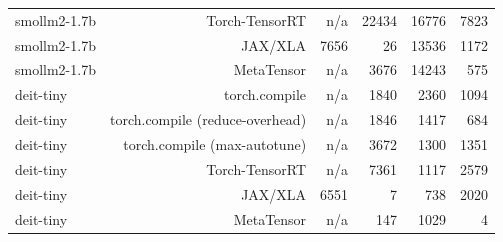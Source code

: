 \begin{tabular}{lrrrrr}
smollm2-1.7b & Torch-TensorRT & n/a & 22434 & 16776 & 7823 \\
smollm2-1.7b & JAX/XLA & 7656 & 26 & 13536 & 1172 \\
smollm2-1.7b & MetaTensor & n/a & 3676 & 14243 & 575 \\
deit-tiny & torch.compile & n/a & 1840 & 2360 & 1094 \\
deit-tiny & torch.compile (reduce-overhead) & n/a & 1846 & 1417 & 684 \\
deit-tiny & torch.compile (max-autotune) & n/a & 3672 & 1300 & 1351 \\
deit-tiny & Torch-TensorRT & n/a & 7361 & 1117 & 2579 \\
deit-tiny & JAX/XLA & 6551 & 7 & 738 & 2020 \\
deit-tiny & MetaTensor & n/a & 147 & 1029 & 4 \\
\bottomrule
\end{tabular}
